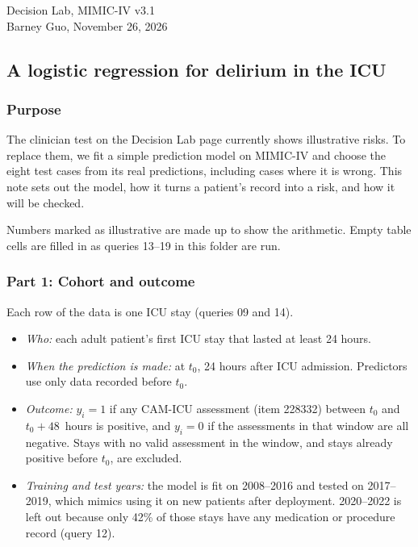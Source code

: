 \documentclass[10pt]{article}
\begin{document}
Decision Lab, MIMIC-IV v3.1 \\
Barney Guo, November 26, 2026



\subsection*{A logistic regression for delirium in the ICU}
\bigskip
\subsubsection*{Purpose}

The clinician test on the Decision Lab page currently shows illustrative risks. To replace them, we fit a simple prediction model on MIMIC-IV and choose the eight test cases from its real predictions, including cases where it is wrong. This note sets out the model, how it turns a patient's record into a risk, and how it will be checked.

Numbers marked as illustrative are made up to show the arithmetic. Empty table cells are filled in as queries 13--19 in this folder are run.



\subsubsection*{Part 1: Cohort and outcome}

Each row of the data is one ICU stay (queries 09 and 14).

\begin{itemize}
	\item \emph{Who:} each adult patient's first ICU stay that lasted at least 24 hours.
	\item \emph{When the prediction is made:} at $t_0$, 24 hours after ICU admission. Predictors use only data recorded before $t_0$.
	\item \emph{Outcome:} $y_i = 1$ if any CAM-ICU assessment (item 228332) between $t_0$ and $t_0 + 48$~hours is positive, and $y_i = 0$ if the assessments in that window are all negative. Stays with no valid assessment in the window, and stays already positive before $t_0$, are excluded.
	\item \emph{Training and test years:} the model is fit on 2008--2016 and tested on 2017--2019, which mimics using it on new patients after deployment. 2020--2022 is left out because only 42\% of those stays have any medication or procedure record (query 12).
\end{itemize}
\end{document}
